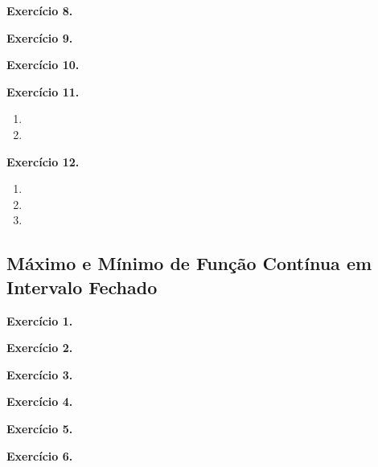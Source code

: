\documentclass[12pt,a4paper]{article}
\begin{document}
\vspace{0.5cm}
\noindent\textbf{Exercício 8.}

\vspace{0.5cm}
\noindent\textbf{Exercício 9.}

\vspace{0.5cm}
\noindent\textbf{Exercício 10.}

\vspace{0.5cm}
\noindent\textbf{Exercício 11.}
\begin{enumerate}
    \renewcommand{\theenumi}{\alph{enumi}}
    \renewcommand{\labelenumi}{\theenumi)}
    \item 
    \item 
\end{enumerate}

\vspace{0.5cm}
\noindent\textbf{Exercício 12.}
\begin{enumerate}
    \renewcommand{\theenumi}{\alph{enumi}}
    \renewcommand{\labelenumi}{\theenumi)}
    \item 
    \item 
    \item 
\end{enumerate}

\subsection{Máximo e Mínimo de Função Contínua em Intervalo Fechado}

\vspace{0.5cm}
\noindent\textbf{Exercício 1.}

\vspace{0.5cm}
\noindent\textbf{Exercício 2.}

\vspace{0.5cm}
\noindent\textbf{Exercício 3.}

\vspace{0.5cm}
\noindent\textbf{Exercício 4.}

\vspace{0.5cm}
\noindent\textbf{Exercício 5.}

\vspace{0.5cm}
\noindent\textbf{Exercício 6.}
\end{document}
